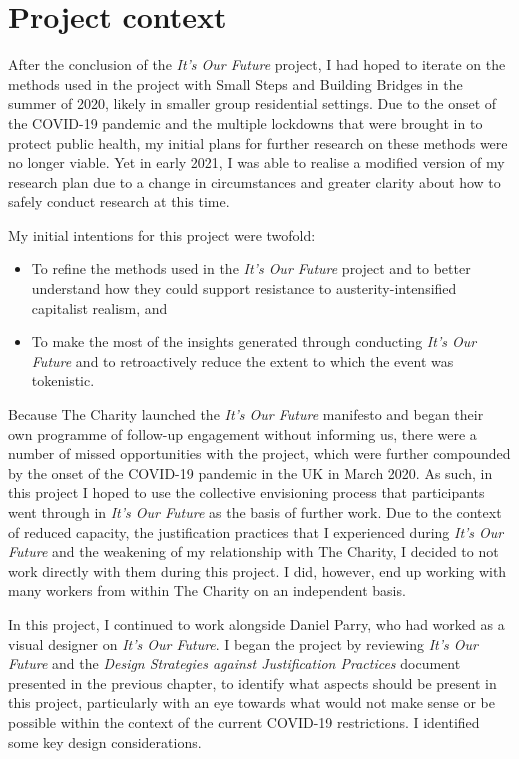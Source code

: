 \section{Project context}
\label{sec:8-1-context}
After the conclusion of the \textit{It's Our Future} project, I had hoped to iterate on the methods used in the project with Small Steps and Building Bridges in the summer of 2020, likely in smaller group residential settings.  Due to the onset of the COVID-19 pandemic and the multiple lockdowns that were brought in to protect public health, my initial plans for further research on these methods were no longer viable. Yet in early 2021, I was able to realise a modified version of my research plan due to a change in circumstances and greater clarity about how to safely conduct research at this time.

My initial intentions for this project were twofold: 
\begin{itemize}
    \item To refine the methods used in the \emph{It's Our Future} project and to better understand how they could support resistance to austerity-intensified capitalist realism, and 
    \item To make the most of the insights generated through conducting \emph{It's Our Future} and to retroactively reduce the extent to which the event was tokenistic.
\end{itemize}
Because The Charity launched the \emph{It's Our Future} manifesto and began their own programme of follow-up engagement without informing us, there were a number of missed opportunities with the project, which were further compounded by the onset of the COVID-19 pandemic in the UK in March 2020. As such, in this project I hoped to use the collective envisioning process that participants went through in \emph{It's Our Future} as the basis of further work. Due to the context of reduced capacity, the justification practices that I experienced during \emph{It's Our Future} and the weakening of my relationship with The Charity, I decided to not work directly with them during this project. I did, however, end up working with many workers from within The Charity on an independent basis.

In this project, I continued to work alongside Daniel Parry, who had worked as a visual designer on \textit{It's Our Future}. I began the project by reviewing \emph{It's Our Future} and the \emph{Design Strategies against Justification Practices} document presented in the previous chapter, to identify what aspects should be present in this project, particularly with an eye towards what would not make sense or be possible within the context of the current COVID-19 restrictions.  I identified some key design considerations. 

